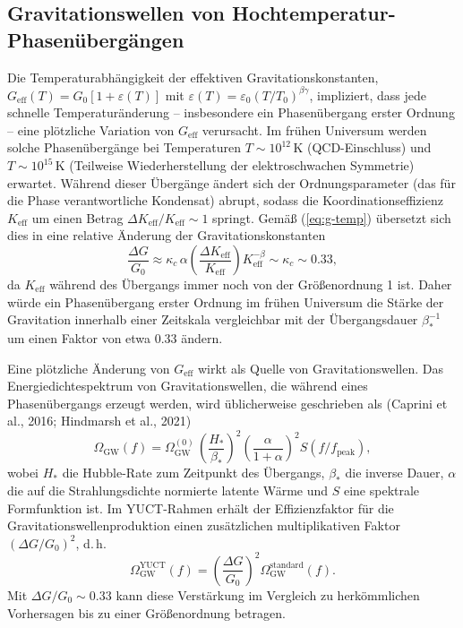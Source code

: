 \documentclass[12pt]{article}
\theoremstyle{remark}
\newcommand{\Keff}{K_{\mathrm{eff}}}
\newcommand{\eps}{\varepsilon}
\begin{document}
	\subsection{Gravitationswellen von Hochtemperatur-Phasenübergängen}
	\label{subsec:gw}
	
	Die Temperaturabhängigkeit der effektiven Gravitationskonstanten,
	$G_{\mathrm{eff}}(T)=G_0[1+\eps(T)]$ mit $\eps(T)=\eps_0(T/T_0)^{\beta\gamma}$,
	impliziert, dass jede schnelle Temperaturänderung – insbesondere ein Phasenübergang erster Ordnung – eine plötzliche Variation von $G_{\mathrm{eff}}$ verursacht.
	Im frühen Universum werden solche Phasenübergänge bei Temperaturen
	$T\sim 10^{12}\,\mathrm{K}$ (QCD-Einschluss) und $T\sim 10^{15}\,\mathrm{K}$
	(Teilweise Wiederherstellung der elektroschwachen Symmetrie) erwartet. Während dieser Übergänge ändert sich der Ordnungsparameter (das für die Phase verantwortliche Kondensat) abrupt, sodass die Koordinationseffizienz $\Keff$ um einen Betrag $\Delta\Keff/\Keff\sim 1$ springt.
	Gemäß (\ref{eq:g-temp}) übersetzt sich dies in eine relative Änderung der Gravitationskonstanten
	\begin{equation}
		\frac{\Delta G}{G_0} \approx \kappa_c\,\alpha \left(\frac{\Delta\Keff}{\Keff}\right)
		\Keff^{-\beta} \sim \kappa_c \sim 0.33,
		\label{eq:deltaG-phase}
	\end{equation}
	da $\Keff$ während des Übergangs immer noch von der Größenordnung 1 ist.
	Daher würde ein Phasenübergang erster Ordnung im frühen Universum die
	Stärke der Gravitation innerhalb einer Zeitskala vergleichbar mit der
	Übergangsdauer $\beta_*^{-1}$ um einen Faktor von etwa 0.33 ändern.
	
	Eine plötzliche Änderung von $G_{\mathrm{eff}}$ wirkt als Quelle von Gravitationswellen.
	Das Energie­dichtespektrum von Gravitationswellen, die während eines Phasenübergangs
	erzeugt werden, wird üblicherweise geschrieben als (Caprini et al., 2016; Hindmarsh et al., 2021)
	\begin{equation}
		\Omega_{\mathrm{GW}}(f) = \Omega_{\mathrm{GW}}^{(0)} \,
		\left(\frac{H_*}{\beta_*}\right)^2 \left(\frac{\alpha}{1+\alpha}\right)^2
		S(f/f_{\mathrm{peak}}),
	\end{equation}
	wobei $H_*$ die Hubble-Rate zum Zeitpunkt des Übergangs, $\beta_*$ die inverse Dauer,
	$\alpha$ die auf die Strahlungsdichte normierte latente Wärme und $S$ eine spektrale
	Formfunktion ist. Im YUCT-Rahmen erhält der Effizienzfaktor für die Gravitationswellenproduktion einen zusätzlichen multiplikativen Faktor
	$(\Delta G/G_0)^2$, d. h.
	\begin{equation}
		\Omega_{\mathrm{GW}}^{\mathrm{YUCT}}(f) = \left(\frac{\Delta G}{G_0}\right)^2
		\Omega_{\mathrm{GW}}^{\mathrm{standard}}(f).
	\end{equation}
	Mit $\Delta G/G_0\sim 0.33$ kann diese Verstärkung im Vergleich zu herkömmlichen Vorhersagen bis zu einer Größenordnung betragen.
	
\end{document}
